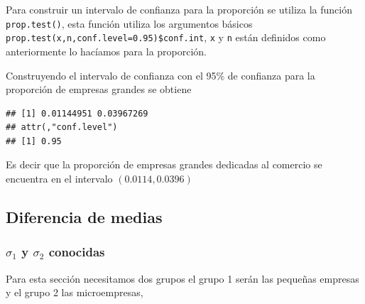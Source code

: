 \documentclass[letterpaper,]{book}
\newenvironment{Shaded}{\begin{snugshade}}{\end{snugshade}}
\newcommand{\KeywordTok}[1]{\textcolor[rgb]{0.13,0.29,0.53}{\textbf{#1}}}
\newcommand{\NormalTok}[1]{#1}
\newcommand{\OperatorTok}[1]{\textcolor[rgb]{0.81,0.36,0.00}{\textbf{#1}}}
\newcommand{\StringTok}[1]{\textcolor[rgb]{0.31,0.60,0.02}{#1}}
\begin{document}
Para construir un intervalo de confianza para la proporción se utiliza la función \texttt{prop.test()}, esta función utiliza los argumentos básicos \texttt{prop.test(x,n,conf.level=0.95)\$conf.int}, \texttt{x} y \texttt{n} están definidos como anteriormente lo hacíamos para la proporción.

Construyendo el intervalo de confianza con el 95\% de confianza para la proporción de empresas grandes se obtiene

\begin{Shaded}
\end{Shaded}

\begin{verbatim}
## [1] 0.01144951 0.03967269
## attr(,"conf.level")
## [1] 0.95
\end{verbatim}

Es decir que la proporción de empresas grandes dedicadas al comercio se encuentra en el intervalo \(\left(0.0114, 0.0396 \right)\)

\hypertarget{diferencia-de-medias}{%
\subsection{Diferencia de medias}\label{diferencia-de-medias}}

\hypertarget{sigma_1-y-sigma_2-conocidas}{%
\subsubsection{\texorpdfstring{\(\sigma_1\) y \(\sigma_2\) conocidas}{\textbackslash{}sigma\_1 y \textbackslash{}sigma\_2 conocidas}}\label{sigma_1-y-sigma_2-conocidas}}

Para esta sección necesitamos dos grupos el grupo 1 serán las pequeñas empresas y el grupo 2 las microempresas,

\begin{Shaded}
\end{Shaded}
\end{document}
